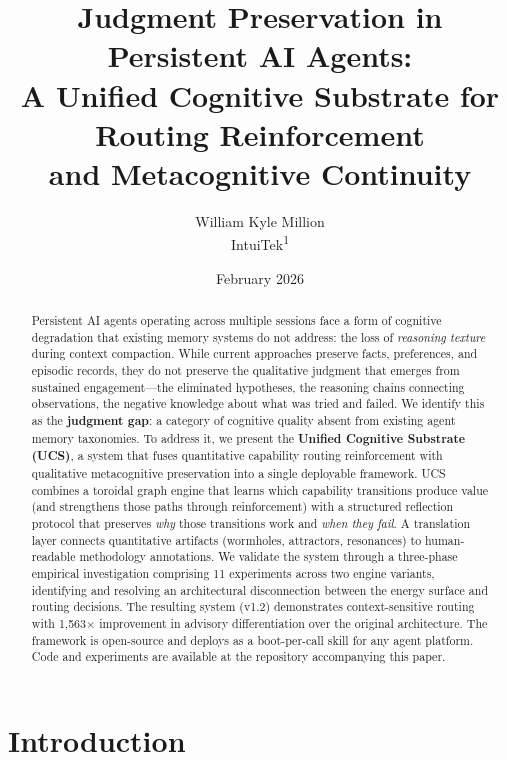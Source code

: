 \documentclass[11pt,a4paper]{article}
\title{%
  Judgment Preservation in Persistent AI Agents:\\
  A Unified Cognitive Substrate for Routing Reinforcement\\
  and Metacognitive Continuity%
}
\author{%
  William Kyle Million\\
  IntuiTek\textsuperscript{1}\\
}
\date{February 2026}
\begin{document}
\maketitle

\begin{abstract}
Persistent AI agents operating across multiple sessions face a form of
cognitive degradation that existing memory systems do not address: the
loss of \emph{reasoning texture} during context compaction. While current
approaches preserve facts, preferences, and episodic records, they do
not preserve the qualitative judgment that emerges from sustained
engagement---the eliminated hypotheses, the reasoning chains connecting
observations, the negative knowledge about what was tried and failed.
We identify this as the \textbf{judgment gap}: a category of cognitive
quality absent from existing agent memory taxonomies. To address it, we
present the \textbf{Unified Cognitive Substrate (UCS)}, a system that
fuses quantitative capability routing reinforcement with qualitative
metacognitive preservation into a single deployable framework.
UCS combines a toroidal graph engine that learns which capability
transitions produce value (and strengthens those paths through
reinforcement) with a structured reflection protocol that preserves
\emph{why} those transitions work and \emph{when they fail}. A
translation layer connects quantitative artifacts (wormholes,
attractors, resonances) to human-readable methodology annotations.
We validate the system through a three-phase empirical investigation
comprising 11 experiments across two engine variants, identifying and
resolving an architectural disconnection between the energy surface
and routing decisions. The resulting system (v1.2) demonstrates
context-sensitive routing with 1,563$\times$ improvement in advisory
differentiation over the original architecture. The framework is
open-source and deploys as a boot-per-call skill for any agent
platform. Code and experiments are available at the repository
accompanying this paper.
\end{abstract}

\section{Introduction}
\label{sec:intro}
\end{document}
